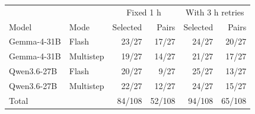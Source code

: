 \begin{tabular}{@{}llrrrr@{}}
\toprule
& & \multicolumn{2}{c}{Fixed 1 h} & \multicolumn{2}{c}{With 3 h retries} \\
Model & Mode & Selected & Pairs & Selected & Pairs \\
\midrule
Gemma-4-31B & Flash & 23/27 & 17/27 & 24/27 & 20/27 \\
Gemma-4-31B & Multistep & 19/27 & 14/27 & 21/27 & 17/27 \\
Qwen3.6-27B & Flash & 20/27 & 9/27 & 25/27 & 13/27 \\
Qwen3.6-27B & Multistep & 22/27 & 12/27 & 24/27 & 15/27 \\
\midrule
Total & & 84/108 & 52/108 & 94/108 & 65/108 \\
\bottomrule
\end{tabular}
